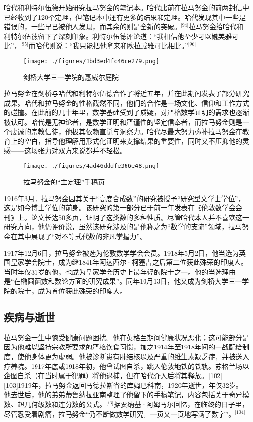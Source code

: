 哈代和利特尔伍德开始研究拉马努金的笔记本。哈代此前在拉马努金的前两封信中已经收到了120个定理，但笔记本中还有更多的结果和定理。哈代发现其中一些是错误的，一些早已被他人发现，而其余的则是全新的突破。\(^\text{[94]}\)拉马努金给哈代和利特尔伍德留下了深刻印象。利特尔伍德评论道：“我相信他至少可以媲美雅可比”，\(^\text{[95]}\)而哈代则说：“我只能把他拿来和欧拉或雅可比相比。”\(^\text{[96]}\)
\begin{figure}[ht]
\centering
\texttt{[image: ./figures/1bd3ed4fc46ce279.png]}
\caption{剑桥大学三一学院的惠威尔庭院} \label{fig_LMLJ_6}
\end{figure}
拉马努金在剑桥与哈代和利特尔伍德合作了将近五年，并在此期间发表了部分研究成果。哈代和拉马努金的性格截然不同，他们的合作是一场文化、信仰和工作方式的碰撞。在此前的几十年里，数学基础受到了质疑，对严格数学证明的需求也逐渐被认可。哈代是无神论者，是数学证明和严谨性的坚定信奉者，而拉马努金则是一个虔诚的宗教信徒，他极其依赖直觉与洞察力。哈代尽最大努力弥补拉马努金在教育上的空白，指导他理解用形式化证明来支撑结果的重要性，同时又不压抑他的灵感——这场张力对双方来说都并不轻松。
\begin{figure}[ht]
\centering
\texttt{[image: ./figures/4ad46dddfe366e48.png]}
\caption{拉马努金的“主定理”手稿页} \label{fig_LMLJ_7}
\end{figure}
1916年3月，拉马努金因其关于“高度合成数”的研究被授予“研究型文学士学位”，这是如今博士学位的前身。该研究的第一部分已于前一年发表在《伦敦数学会会刊》上。论文长达50多页，证明了这类数的多种性质。尽管哈代本人并不喜欢这一研究方向，他仍评价说，虽然该研究涉及的是他称之为“数学的支流”领域，拉马努金在其中展现了“对不等式代数的非凡掌握力”。

1917年12月6日，拉马努金被选为伦敦数学学会会员。1918年5月2日，他当选为英国皇家学会院士，成为继1841年阿达西尔·柯塞吉之后第二位获此殊荣的印度人。当时年仅31岁的他，也成为皇家学会历史上最年轻的院士之一。他的当选理由是“在椭圆函数和数论方面的研究成果”。同年10月13日，他又成为剑桥大学三一学院的院士，成为首位获此殊荣的印度人。
\subsection{疾病与逝世}
拉马努金一生中饱受健康问题困扰。他在英格兰期间健康状况恶化；这可能部分是因为他难以坚持宗教所要求的严格饮食习惯，加之1914年至1918年间的一战配给制度，使他身体更为虚弱。他被诊断患有肺结核以及严重的维生素缺乏症，并被送入疗养院。1917年底或1918年初，他曾试图自杀，跳入伦敦地铁的铁轨。苏格兰场以企图自杀（在当时属于犯罪）将他逮捕，但在哈代介入后将其释放。[102][103]1919年，拉马努金返回马德拉斯省的库姆巴科南，1920年逝世，年仅32岁。他去世后，他的弟弟蒂鲁纳拉亚南整理了他留下的手稿笔记，内容包括关于奇异模数、超几何级数和连分数的公式。\(^\text{[43]}\)据贾纳基·阿姆马尔回忆，在临终的日子里，尽管忍受着剧痛，拉马努金“仍不断做数学研究，一页又一页地写满了数字”。\(^\text{[104]}\)

